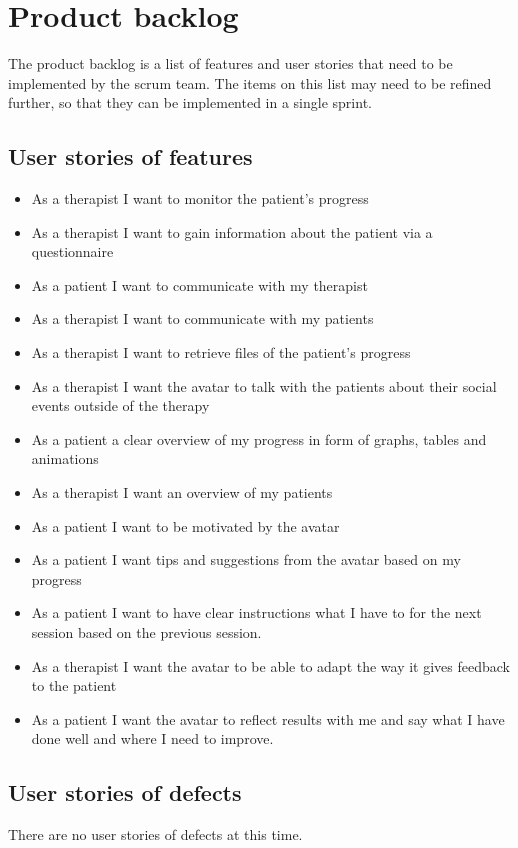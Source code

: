 \chapter{Product backlog}
The product backlog is a list of features and user stories that need to be implemented by the \gls{scrum} team. The items on this list may need to be refined further, so that they can be implemented in a single sprint.
\section{User stories of features}
\begin{itemize}
\item As a therapist I want to monitor the patient's progress \hspace {$10$}
\item As a therapist I want to gain information about the patient via a questionnaire
\item As a patient I want to communicate with my therapist
\item As a therapist I want to communicate with my patients
\item As a therapist I want to retrieve files of the patient's progress
\item As a therapist I want the \gls{avatar} to talk with the patients about their social events outside of the therapy
\item As a patient a clear overview of my progress in form of graphs, tables and animations
\item As a therapist I want an overview of my patients 
\item As a patient I want to be motivated by the \gls{avatar}
\item As a patient I want tips and suggestions from the \gls{avatar} based on my progress
\item As a patient I want to have clear instructions what I have to for the next session based on the previous session.
\item As a therapist I want the \gls{avatar} to be able to adapt the way it gives feedback to the patient
\item As a patient I want the \gls{avatar} to reflect results with me and say what I have done well and where I need to improve.
\end{itemize}
 
\section{User stories of defects}
There are no user stories of defects at this time.

